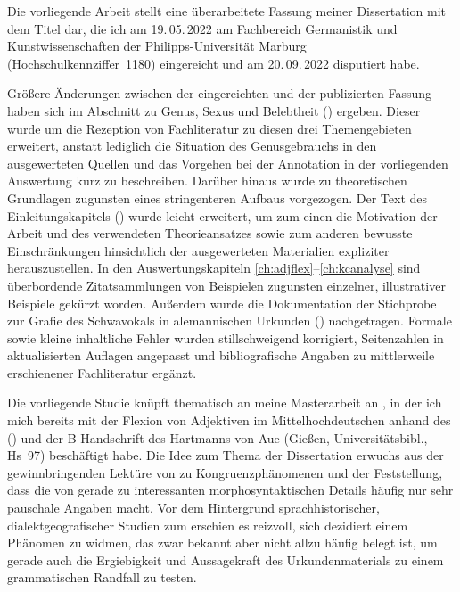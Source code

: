 \addchap{\lsPrefaceTitle}

Die vorliegende Arbeit stellt eine überarbeitete Fassung meiner Dissertation
mit dem Titel  dar, die ich am 19.\,05.\,2022 am Fachbereich
Germanistik und Kunstwissenschaften der Philipps-Universität Marburg
(Hochschulkennziffer~1180) eingereicht und am 20.\,09.\,2022 disputiert habe.

Größere Änderungen zwischen der eingereichten und der publizierten Fassung
haben sich im Abschnitt zu Genus, Sexus und Belebtheit ()
ergeben. Dieser wurde um die Rezeption von Fachliteratur zu diesen drei
Themengebieten erweitert, anstatt lediglich die Situation des Genusgebrauchs in
den ausgewerteten Quellen und das Vorgehen bei der Annotation in der
vorliegenden Auswertung kurz zu beschreiben. Darüber hinaus wurde
 zu theoretischen Grundlagen zugunsten eines stringenteren
Aufbaus vorgezogen. Der Text des Einleitungskapitels ()
wurde leicht erweitert, um zum einen die Motivation der Arbeit und des
verwendeten Theorieansatzes sowie zum anderen bewusste Einschränkungen
hinsichtlich der ausgewerteten Materialien expliziter herauszustellen. In den
Auswertungskapiteln \ref{ch:adjflex}--\ref{ch:kcanalyse} sind überbordende
Zitatsammlungen von Beispielen zugunsten einzelner, illustrativer Beispiele
gekürzt worden. Außerdem wurde die Dokumentation der Stichprobe zur Grafie des
Schwa\-vokals in alemannischen Urkunden ()
nachgetragen. Formale sowie kleine inhaltliche Fehler wurden stillschweigend
korrigiert, Seitenzahlen in aktualisierten Auflagen angepasst und
bibliografische Angaben zu mittlerweile erschienener Fach\-literatur ergänzt.

Die vorliegende Studie knüpft thematisch an meine Masterarbeit an
\autocite{becker2016}, in der ich mich bereits mit der Flexion von Adjektiven
im Mittelhochdeutschen anhand des  (\CAO) und der B-Handschrift des  Hartmanns von
Aue (Gießen, Universitätsbibl., Hs~97) beschäftigt habe. Die Idee zum Thema der
Dissertation erwuchs aus der gewinnbringenden Lektüre von \citet{corbett2006}
zu Kongruenz\-phänomenen und der Feststellung, dass die  von \citet{paul2007} gerade zu interessanten morpho\-syntaktischen
Details häufig nur sehr pauschale Angaben macht. Vor dem Hintergrund
sprach\-historischer, dialekt\-geografischer Studien zum \CAO{}
\autocite{beckerschallert2021,beckerschallert2022a, beckerschallert2022b}
erschien es reizvoll, sich dezidiert einem Phänomen zu widmen, das zwar bekannt
aber nicht allzu häufig belegt ist, um gerade auch die Ergiebigkeit und
Aussagekraft des Urkunden\-materials zu einem grammatischen Randfall zu testen.

